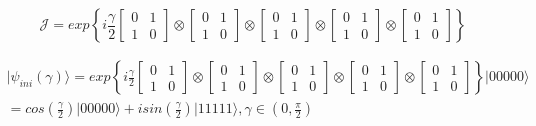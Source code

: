\begin{equation}
\mathcal{J}=exp\left\{ i\frac{\gamma}{2}\left[\begin{array}{cc}
0 & 1\\
1 & 0
\end{array}\right]\otimes\left[\begin{array}{cc}
0 & 1\\
1 & 0
\end{array}\right]\otimes\left[\begin{array}{cc}
0 & 1\\
1 & 0
\end{array}\right]\otimes\left[\begin{array}{cc}
0 & 1\\
1 & 0
\end{array}\right]
\otimes\left[\begin{array}{cc}
0 & 1\\
1 & 0
\end{array}\right]
\right\}
\label{eq:matrix_exponencial_esoterica}
\end{equation} 

\begin{center}
\begin{equation}
\begin{split}
\vert\psi_{ini}(\gamma)\rangle=exp\left\{ i\frac{\gamma}{2}\left[\begin{array}{cc}
0 & 1\\
1 & 0
\end{array}\right]\otimes\left[\begin{array}{cc}
0 & 1\\
1 & 0
\end{array}\right]\otimes\left[\begin{array}{cc}
0 & 1\\
1 & 0
\end{array}\right]\otimes\left[\begin{array}{cc}
0 & 1\\
1 & 0
\end{array}\right]\otimes\left[\begin{array}{cc}
0 & 1\\
1 & 0
\end{array}\right]\right\} \vert00000\rangle \\
=cos(\frac{\gamma}{2})\vert00000\rangle+isin(\frac{\gamma}{2})\vert11111\rangle,\gamma\in(0,\frac{\pi}{2})
\end{split}
\label{eq:estado_inicial_pg}
\end{equation}
\end{center}



